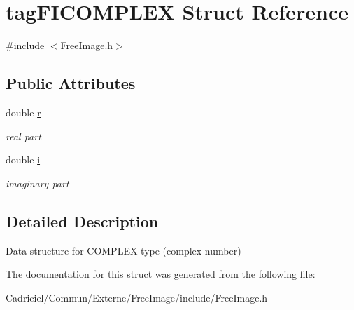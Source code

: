 \hypertarget{structtag_f_i_c_o_m_p_l_e_x}{}\section{tag\+F\+I\+C\+O\+M\+P\+L\+EX Struct Reference}
\label{structtag_f_i_c_o_m_p_l_e_x}


{\ttfamily \#include $<$Free\+Image.\+h$>$}

\subsection*{Public Attributes}
\begin{DoxyCompactItemize}
\item 
double \hyperlink{structtag_f_i_c_o_m_p_l_e_x_a448818f3de56c81064bdcb1ba78a7ead}{r}\hypertarget{structtag_f_i_c_o_m_p_l_e_x_a448818f3de56c81064bdcb1ba78a7ead}{}\label{structtag_f_i_c_o_m_p_l_e_x_a448818f3de56c81064bdcb1ba78a7ead}

\begin{DoxyCompactList}\small\item\em real part \end{DoxyCompactList}\item 
double \hyperlink{structtag_f_i_c_o_m_p_l_e_x_ad2cc2cc6d32c1e5496f2c77e185d8218}{i}\hypertarget{structtag_f_i_c_o_m_p_l_e_x_ad2cc2cc6d32c1e5496f2c77e185d8218}{}\label{structtag_f_i_c_o_m_p_l_e_x_ad2cc2cc6d32c1e5496f2c77e185d8218}

\begin{DoxyCompactList}\small\item\em imaginary part \end{DoxyCompactList}\end{DoxyCompactItemize}


\subsection{Detailed Description}
Data structure for C\+O\+M\+P\+L\+EX type (complex number) 

The documentation for this struct was generated from the following file\+:\begin{DoxyCompactItemize}
\item 
Cadriciel/\+Commun/\+Externe/\+Free\+Image/include/Free\+Image.\+h\end{DoxyCompactItemize}

